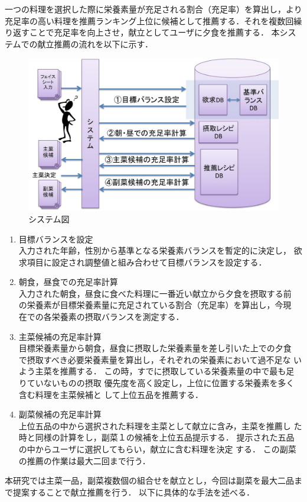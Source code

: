 \documentclass[11pt,titlepage,uplatex]{ujreport}
\begin{document}
一つの料理を選択した際に栄養素量が充足される割合（充足率）を算出し，より
充足率の高い料理を推薦ランキング上位に候補として推薦する．それを複数回繰
り返すことで充足率を向上させ，献立としてユーザに夕食を推薦する．
本システムでの献立推薦の流れを以下に示す．
\begin{figure}[tbh]
  \centering
\includegraphics[scale=0.3]{system.pdf}
\caption{システム図}
\label{システム図}
\end{figure}
\begin{enumerate}
\item{目標バランスを設定}\\
     入力された年齢，性別から基準となる栄養素バランスを暫定的に決定し，
     欲求項目に設定され調整値と組み合わせて目標バランスを設定する．
\item{朝食，昼食での充足率計算}\\
     入力された朝食，昼食に食べた料理に一番近い献立から夕食を摂取する前
     の栄養素が目標栄養素量に充足されている割合（充足率）を算出し，今現
     在での各栄養素の摂取バランスを測定する．
\item{主菜候補の充足率計算}\\
     目標栄養素量から朝食，昼食に摂取した栄養素量を差し引いた上での夕食
     で摂取すべき必要栄養素量を算出し，それぞれの栄養素において過不足な
     いよう主菜を推薦する．
     この時，すでに摂取している栄養素量の中で最も足りていないものの摂取
     優先度を高く設定し，上位に位置する栄養素を多く含む料理を主菜候補と
     して上位五品を推薦する．
\item{副菜候補の充足率計算}\\
     上位五品の中から選択された料理を主菜として献立に含み，主菜を推薦し
     た時と同様の計算をし，副菜１の候補を上位五品提示する．
     提示された五品の中からユーザに選択してもらい，献立に含む料理を決定
     する．
     この副菜の推薦の作業は最大二回まで行う．
\end{enumerate}
本研究では主菜一品，副菜複数個の組合せを献立とし，今回は副菜を最大二品ま
で提案することで献立推薦を行う．
以下に具体的な手法を述べる．
\end{document}
